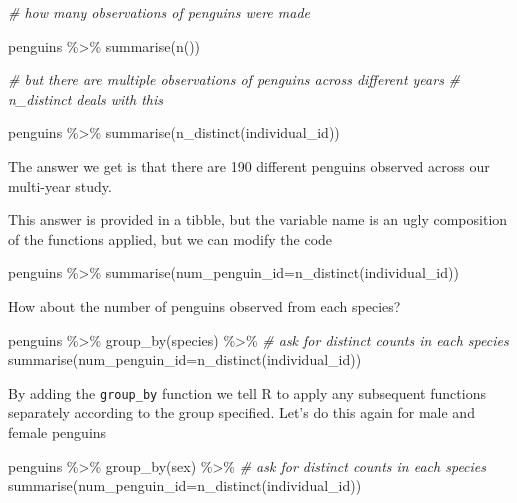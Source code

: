 \documentclass[
]{book}
\newenvironment{Shaded}{\begin{snugshade}}{\end{snugshade}}
\newcommand{\AttributeTok}[1]{\textcolor[rgb]{0.77,0.63,0.00}{#1}}
\newcommand{\CommentTok}[1]{\textcolor[rgb]{0.56,0.35,0.01}{\textit{#1}}}
\newcommand{\FunctionTok}[1]{\textcolor[rgb]{0.00,0.00,0.00}{#1}}
\newcommand{\NormalTok}[1]{#1}
\newcommand{\SpecialCharTok}[1]{\textcolor[rgb]{0.00,0.00,0.00}{#1}}
\begin{document}
\begin{Shaded}
\begin{Highlighting}[]
\CommentTok{\# how many observations of penguins were made}

\NormalTok{penguins }\SpecialCharTok{\%\textgreater{}\%} 
  \FunctionTok{summarise}\NormalTok{(}\FunctionTok{n}\NormalTok{())}

\CommentTok{\# but there are multiple observations of penguins across different years}
\CommentTok{\# n\_distinct deals with this}

\NormalTok{penguins }\SpecialCharTok{\%\textgreater{}\%} 
  \FunctionTok{summarise}\NormalTok{(}\FunctionTok{n\_distinct}\NormalTok{(individual\_id))}
\end{Highlighting}
\end{Shaded}

The answer we get is that there are 190 different penguins observed across our multi-year study.

This answer is provided in a tibble, but the variable name is an ugly composition of the functions applied, but we can modify the code

\begin{Shaded}
\begin{Highlighting}[]
\NormalTok{penguins }\SpecialCharTok{\%\textgreater{}\%} 
  \FunctionTok{summarise}\NormalTok{(}\AttributeTok{num\_penguin\_id=}\FunctionTok{n\_distinct}\NormalTok{(individual\_id))}
\end{Highlighting}
\end{Shaded}

How about the number of penguins observed from each species?

\begin{Shaded}
\begin{Highlighting}[]
\NormalTok{penguins }\SpecialCharTok{\%\textgreater{}\%} 
  \FunctionTok{group\_by}\NormalTok{(species) }\SpecialCharTok{\%\textgreater{}\%} \CommentTok{\# ask for distinct counts in each species}
  \FunctionTok{summarise}\NormalTok{(}\AttributeTok{num\_penguin\_id=}\FunctionTok{n\_distinct}\NormalTok{(individual\_id))}
\end{Highlighting}
\end{Shaded}

By adding the \texttt{group\_by} function we tell R to apply any subsequent functions separately according to the group specified. Let's do this again for male and female penguins

\begin{Shaded}
\begin{Highlighting}[]
\NormalTok{penguins }\SpecialCharTok{\%\textgreater{}\%} 
  \FunctionTok{group\_by}\NormalTok{(sex) }\SpecialCharTok{\%\textgreater{}\%} \CommentTok{\# ask for distinct counts in each species}
  \FunctionTok{summarise}\NormalTok{(}\AttributeTok{num\_penguin\_id=}\FunctionTok{n\_distinct}\NormalTok{(individual\_id))}
\end{Highlighting}
\end{Shaded}
\end{document}
